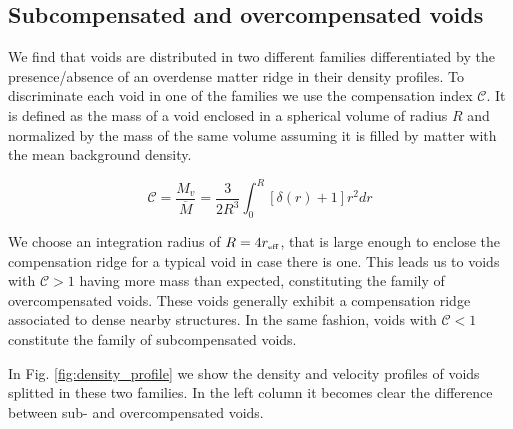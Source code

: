 \documentclass[a4,useAMS,usenatbib,usegraphicx]{mn2e}
\newcommand{\eq}[2]{\begin{equation} \label{eq:#1} #2 \end{equation}}
\newcommand{\reff}{{\ifmmode{r_{\mbox{\tiny eff}}}\else{$r_{\mbox{\tiny eff}}$}\fi}}
\begin{document}
\subsection{Subcompensated and overcompensated voids}
\label{subsec:enclosedmass}

We find that voids are distributed in two different families
differentiated by the 
presence/absence of an overdense matter ridge in their density
profiles. 
To discriminate each void in one of the families we use the
compensation  index $\mathcal{C}$.
It is defined as the mass of a void enclosed in a spherical volume of
radius $R$ and normalized by the mass of the same volume assuming
it is filled by matter with the mean background density.

\eq{compensation}
{\mathcal{C} = \frac{M_v}{\overline{M}} = \frac{3}{2R^{3}} \int_0^{R} [\delta(r) + 1] r^2 dr}

We choose an integration radius of $R=4\reff$, that is large enough to 
enclose the compensation ridge for a typical void in case there is one. 
This leads us to voids with $\mathcal{C}>1$ having more mass than expected, 
constituting the family of overcompensated voids. 
These voids generally  exhibit a compensation ridge associated to
dense nearby structures. 
In the same fashion, voids with $\mathcal{C}<1$ constitute the family
of  subcompensated voids. 

In Fig. \ref{fig:density_profile} we show the density and velocity profiles
of voids splitted in these two families. 
In the left column it becomes clear the difference between sub- and
overcompensated voids.
\end{document}
